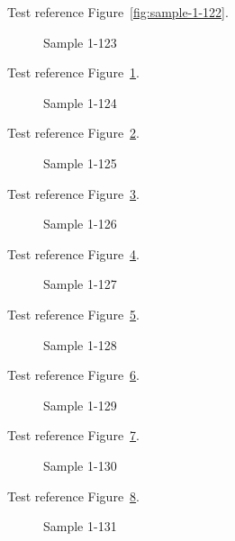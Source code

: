 Test reference Figure~\ref{fig:sample-1-122}.

\begin{figure}[tbhp]
\caption{Sample 1-123}
\label{fig:sample-1-123}
\end{figure}

Test reference Figure~\ref{fig:sample-1-123}.

\begin{figure}[tbhp]
\caption{Sample 1-124}
\label{fig:sample-1-124}
\end{figure}

Test reference Figure~\ref{fig:sample-1-124}.

\begin{figure}[tbhp]
\caption{Sample 1-125}
\label{fig:sample-1-125}
\end{figure}

Test reference Figure~\ref{fig:sample-1-125}.

\begin{figure}[tbhp]
\caption{Sample 1-126}
\label{fig:sample-1-126}
\end{figure}

Test reference Figure~\ref{fig:sample-1-126}.

\begin{figure}[tbhp]
\caption{Sample 1-127}
\label{fig:sample-1-127}
\end{figure}

Test reference Figure~\ref{fig:sample-1-127}.

\begin{figure}[tbhp]
\caption{Sample 1-128}
\label{fig:sample-1-128}
\end{figure}

Test reference Figure~\ref{fig:sample-1-128}.

\begin{figure}[tbhp]
\caption{Sample 1-129}
\label{fig:sample-1-129}
\end{figure}

Test reference Figure~\ref{fig:sample-1-129}.

\begin{figure}[tbhp]
\caption{Sample 1-130}
\label{fig:sample-1-130}
\end{figure}

Test reference Figure~\ref{fig:sample-1-130}.

\begin{figure}[tbhp]
\caption{Sample 1-131}
\label{fig:sample-1-131}
\end{figure}

